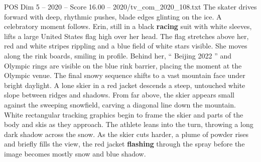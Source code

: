 \begin{textsample}{POS Dim 5 – 2020 – Score 16.00 – 2020/tv\_com\_2020\_108.txt}
The skater drives forward with deep, rhythmic pushes, blade edges glinting on the ice.
A celebratory moment follows.
Erin, still in a black \textbf{racing} suit with white sleeves, lifts a large United States flag high over her head.
The flag stretches above her, red and white stripes rippling and a blue field of white stars visible.
She moves along the rink boards, smiling in profile.
Behind her, “ Beijing 2022 ” and Olympic rings are visible on the blue rink barrier, placing the moment at the Olympic venue.
The final snowy sequence shifts to a vast mountain face under bright daylight.
A lone skier in a red jacket descends a steep, untouched white slope between ridges and shadows.
From far above, the skier appears small against the sweeping snowfield, carving a diagonal line down the mountain.
White rectangular tracking graphics begin to frame the skier and parts of the body and skis as they approach.
The athlete leans into the turn, throwing a long dark shadow across the snow.
As the skier cuts harder, a plume of powder rises and briefly fills the view, the red jacket \textbf{flashing} through the spray before the image becomes mostly snow and blue shadow.

\end{textsample}
